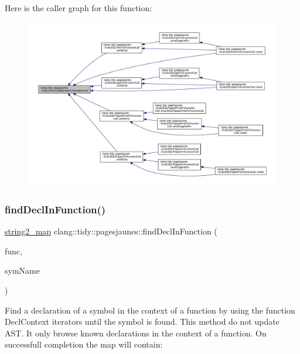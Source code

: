 Here is the caller graph for this function\+:
\nopagebreak
\begin{figure}[H]
\begin{center}
\leavevmode
\includegraphics[width=350pt]{namespaceclang_1_1tidy_1_1pagesjaunes_a6adf1713b6f527e8823a8098aa1022ef_icgraph}
\end{center}
\end{figure}
\mbox{\label{namespaceclang_1_1tidy_1_1pagesjaunes_a67de085293c9e68c265f89f9159c7b8f}} 
\subsubsection{\texorpdfstring{find\+Decl\+In\+Function()}{findDeclInFunction()}}
{\footnotesize\ttfamily \hyperlink{_exec_s_q_l_common_8h_a68798f7ec86fe00f8e9d5e01773e583b}{string2\+\_\+map} clang\+::tidy\+::pagesjaunes\+::find\+Decl\+In\+Function (\begin{DoxyParamCaption}\item[{const Function\+Decl $\ast$}]{func,  }\item[{const std\+::string \&}]{sym\+Name }\end{DoxyParamCaption})}



Find a declaration of a symbol in the context of a function by using the function Decl\+Context iterators until the symbol is found. This method do not update A\+ST. It only browse known declarations in the context of a function. On successfull completion the map will contain\+: 


